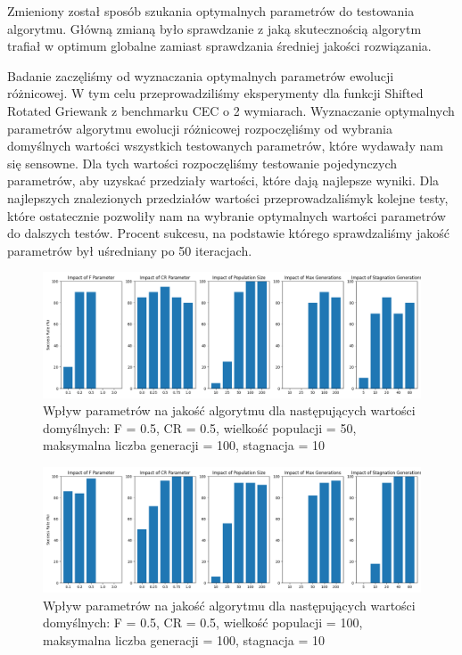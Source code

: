 \documentclass{article}
\begin{document}
Zmieniony został sposób szukania optymalnych parametrów do testowania algorytmu. Główną zmianą było sprawdzanie z jaką skutecznością algorytm trafiał w optimum globalne zamiast sprawdzania średniej jakości rozwiązania.


Badanie zaczęliśmy od wyznaczania optymalnych parametrów ewolucji różnicowej. W tym celu przeprowadziliśmy eksperymenty dla funkcji Shifted Rotated Griewank z benchmarku CEC o 2 wymiarach. Wyznaczanie optymalnych parametrów algorytmu ewolucji różnicowej rozpoczęliśmy od wybrania domyślnych wartości wszystkich testowanych parametrów, które wydawały nam się sensowne. Dla tych wartości rozpoczęliśmy testowanie pojedynczych parametrów, aby uzyskać przedziały wartości, które dają najlepsze wyniki. Dla najlepszych znalezionych przedziałów wartości przeprowadzaliśmyk kolejne testy, które ostatecznie pozwoliły nam na wybranie optymalnych wartości parametrów do dalszych testów. Procent sukcesu, na podstawie którego sprawdzaliśmy jakość parametrów był uśredniany po 50 iteracjach. 

\begin{figure}[H]
    \centering
    \includegraphics[width=\textwidth]{parameter_tuning_results_separate1.png}
    \caption{Wpływ parametrów na jakość algorytmu dla następujących wartości domyślnych: F = 0.5, CR = 0.5, wielkość populacji = 50, maksymalna liczba generacji = 100, stagnacja = 10}
    \label{fig:parameter_results1}
\end{figure}

\begin{figure}[H]
    \centering
    \includegraphics[width=\textwidth]{parameter_tuning_results_separate2.png}
    \caption{Wpływ parametrów na jakość algorytmu dla następujących wartości domyślnych: F = 0.5, CR = 0.5, wielkość populacji = 100, maksymalna liczba generacji = 100, stagnacja = 10}
    \label{fig:parameter_results2}
\end{figure}
\end{document}
